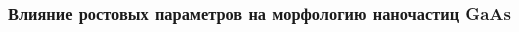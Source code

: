 \begin{frame}[c]
	\frametitle{Влияние ростовых параметров на морфологию наночастиц GaAs}
	\centering
	\begin{columns}[onlytextwidth]
		\begin{column}{0.48\textwidth}
			\centering
			\\[10pt]
			\begin{minipage}[t]{0.31\linewidth}
			\end{minipage}
			\begin{minipage}[t]{0.31\linewidth}
			\end{minipage}
			\begin{minipage}[t]{0.31\linewidth}
			\end{minipage}
		\end{column}
		\begin{column}{0.48\textwidth}
			\centering
			\\[10pt]
			\begin{minipage}[t]{0.31\linewidth}
			\end{minipage}
			\begin{minipage}[t]{0.31\linewidth}
			\end{minipage}
			\begin{minipage}[t]{0.31\linewidth}
			\end{minipage}
		\end{column}
	\end{columns}
\end{frame}

